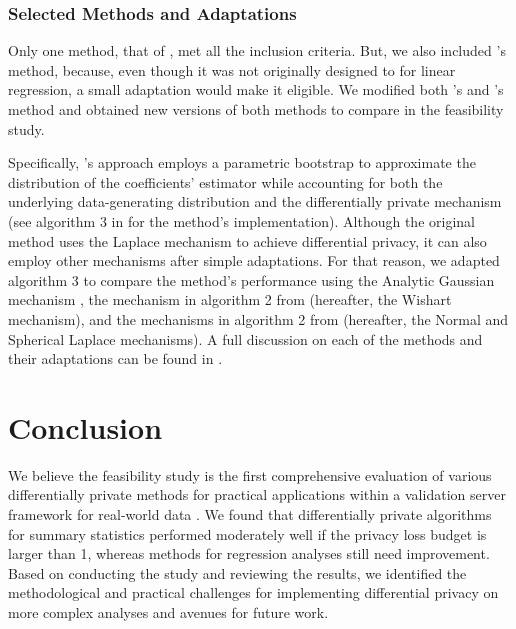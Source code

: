 \subsubsection{Selected Methods and Adaptations}\label{subsubsec:reg_meth}
Only one method, that of \citet{ferrando2020general}, met all the inclusion criteria. But, we also included \citet{brawner2018bootstrap}'s method, because, even though it was not originally designed to for linear regression, a small adaptation would make it eligible. We modified both \citet{ferrando2020general}'s and \citet{brawner2018bootstrap}'s method and obtained new versions of both methods to compare in the feasibility study. 

Specifically, \citet{ferrando2020general}'s approach employs a parametric bootstrap to approximate the distribution of the coefficients' estimator while accounting for both the underlying data-generating distribution and the differentially private mechanism (see algorithm 3 in \citet{ferrando2020general} for the method's implementation). Although the original method uses the Laplace mechanism to achieve differential privacy, it can also employ other mechanisms after simple adaptations. For that reason, we adapted algorithm 3 to compare the method's performance using the Analytic Gaussian mechanism \citet{balle2018improving}, the mechanism in algorithm 2 from \citet{sheffet2019old} (hereafter, the Wishart mechanism), and the mechanisms in algorithm 2 from \citet{wang2019differentially} (hereafter, the Normal and Spherical Laplace mechanisms). A full discussion on each of the methods and their adaptations can be found in \citet{barrientos2021}.


\section{Conclusion}\label{sec:conclusion}
We believe the feasibility study is the first comprehensive evaluation of various differentially private methods for practical applications within a validation server framework for real-world data \citep{barrientos2021}. We found that differentially private algorithms for summary statistics performed moderately well if the privacy loss budget is larger than 1, whereas methods for regression analyses still need improvement. Based on conducting the study and reviewing the results, we identified the methodological and practical challenges for implementing differential privacy on more complex analyses and avenues for future work.

